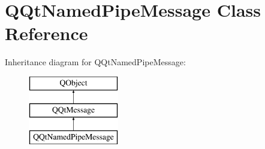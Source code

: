 \hypertarget{class_q_qt_named_pipe_message}{}\section{Q\+Qt\+Named\+Pipe\+Message Class Reference}
\label{class_q_qt_named_pipe_message}
Inheritance diagram for Q\+Qt\+Named\+Pipe\+Message\+:\begin{figure}[H]
\begin{center}
\leavevmode
\includegraphics[height=3.000000cm]{class_q_qt_named_pipe_message}
\end{center}
\end{figure}
